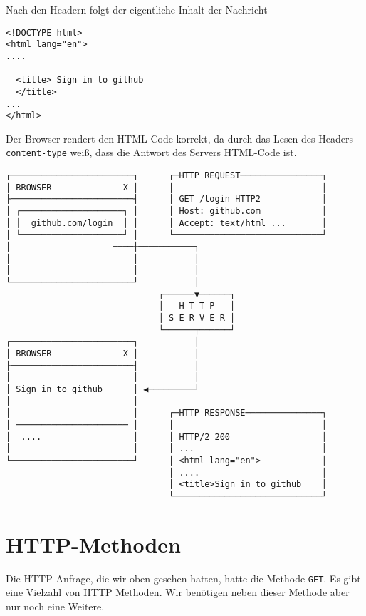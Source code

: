 \documentclass[a4paper]{scrartcl}
\begin{document}
Nach den Headern folgt der eigentliche Inhalt der Nachricht 

\begin{Verbatim}[label={verb:verbatim4}]
<!DOCTYPE html>
<html lang="en">
....

  <title> Sign in to github
  </title>
...
</html>
\end{Verbatim}
Der Browser rendert den HTML-Code korrekt, da durch das Lesen des Headers \texttt{content-type} weiß, dass die Antwort des Servers HTML-Code ist.



\begin{Verbatim}[label={verb:verbatim5}]
┌────────────────────────┐      ┌─HTTP REQUEST────────────────┐
│ BROWSER              X │      │                             │
├────────────────────────┤      │ GET /login HTTP2            │
│ ┌────────────────────┐ │      │ Host: github.com            │
│ │  github.com/login  │ │      │ Accept: text/html ...       │
│ └────────────────────┘ │      └─────────────────────────────┘
│                    ────┼───────────┐
│                        │           │
│                        │           │
└────────────────────────┘           │
                              ┌──────▼──────┐
                              │   H T T P   │
                              │ S E R V E R │
                              └──────┬──────┘
┌────────────────────────┐           │
│ BROWSER              X │           │
├────────────────────────┤           │
│                        │           │
│ Sign in to github      │ ◀─────────┘
│                        │
│                        │      ┌─HTTP RESPONSE───────────────┐
│ ────────────────────── │      │                             │
│  ....                  │      │ HTTP/2 200                  │
│                        │      │ ...                         │
└────────────────────────┘      │ <html lang="en">            │
                                │ ....                        │
                                │ <title>Sign in to github    │
                                └─────────────────────────────┘
\end{Verbatim}

\section{HTTP-Methoden}\label{sec:http-methoden}

Die HTTP-Anfrage, die wir oben gesehen hatten, hatte die Methode \texttt{GET}.
Es gibt eine Vielzahl von HTTP Methoden.
Wir benötigen neben dieser Methode aber nur noch eine Weitere.
\end{document}
